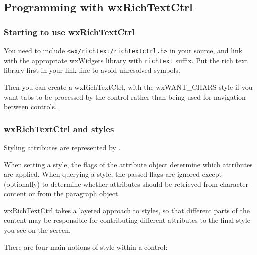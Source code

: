 \subsection{Programming with wxRichTextCtrl}

\subsubsection{Starting to use wxRichTextCtrl}

You need to include {\tt <wx/richtext/richtextctrl.h>} in your source, and link
with the appropriate wxWidgets library with {\tt richtext} suffix. Put the rich text
library first in your link line to avoid unresolved symbols.

Then you can create a wxRichTextCtrl, with the wxWANT\_CHARS style if you want tabs to
be processed by the control rather than being used for navigation between controls.

\subsubsection{wxRichTextCtrl and styles}

Styling attributes are represented by .

When setting a style, the flags of the attribute object determine which
attributes are applied. When querying a style, the passed flags are ignored
except (optionally) to determine whether attributes should be retrieved from
character content or from the paragraph object.

wxRichTextCtrl takes a layered approach to styles, so that different parts of
the content may be responsible for contributing different attributes to the final
style you see on the screen.

There are four main notions of style within a control:

